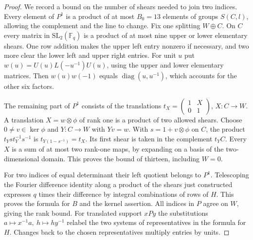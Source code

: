 \documentclass[a4paper,11pt]{article}
\theoremstyle{definition}
\theoremstyle{remark}
\numberwithin{equation}{section}
\begin{document}
\begin{proof}
We record a bound on the number of shears needed to join two
indices. Every element of \(P^1\) is a product of at most
\(B_0=13\) elements of groups \(S(C,l)\), allowing the
complement and the line to change. Fix one splitting \(W\oplus C\).
On \(C\) every matrix in \(\mathrm{SL}_2(\mathbb F_q)\) is a
product of at most nine upper or lower elementary shears.
One row addition makes the upper left entry nonzero if necessary,
and two more clear the lower left and upper right entries.
For unit \(u\) put \(w(u)=U(u)L(-u^{-1})U(u)\), using the upper
and lower elementary matrices. Then \(w(u)w(-1)\) equals
\(\operatorname{diag}(u,u^{-1})\), which accounts for the other
six factors.

The remaining part of \(P^1\) consists of the translations
\(t_X=\left(\begin{smallmatrix}1&X\\0&1\end{smallmatrix}\right)\),
\(X:C\to W\). A translation \(X=w\otimes\phi\) of rank one
is a product of two allowed shears. Choose \(0\ne v\in\ker\phi\)
and \(Y:C\to W\) with \(Yv=w\). With \(s=1+v\otimes\phi\)
on \(C\), the product \(t_Ys t_Y^{-1}s^{-1}\) is
\(t_{Y(1-s^{-1})}=t_X\). Its first shear is taken in the
complement \(t_Y C\). Every \(X\) is a sum of at most two
rank-one maps, by expanding on a basis of the two-dimensional
domain. This proves the bound of thirteen, including \(W=0\).

For two indices of equal determinant their left quotient belongs
to \(P^1\). Telescoping the Fourier difference identity along
a product of the shears just constructed expresses \(q\) times
their difference by integral combinations of rows of \(H\).
This proves the formula for \(B\) and the kernel assertion.
All indices in \(P\) agree on \(W\), giving the rank bound.
For translated support \(xPy\) the substitutions \(a\mapsto
x^{-1}a,\ h\mapsto h y^{-1}\) relabel the two systems of
representatives in the formula for \(H\). Changes back to
the chosen representatives multiply entries by units.
\end{proof}
\end{document}
